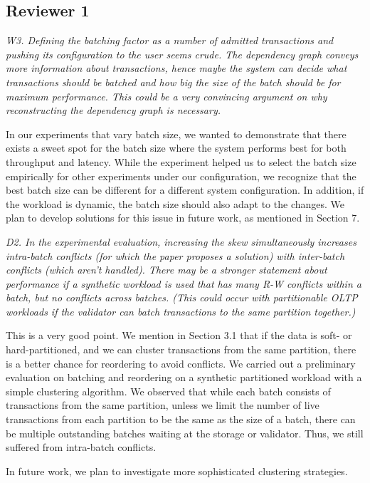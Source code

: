 \documentclass{article}
\begin{document}
\subsection{Reviewer 1}

\emph{W3. Defining the batching factor as a number of admitted transactions and pushing its configuration to the user seems crude. The dependency graph conveys more information about transactions, hence maybe the system can decide what transactions should be batched and how big the size of the batch should be for maximum performance. This could be a very convincing argument on why reconstructing the dependency graph is necessary.}

In our experiments that vary batch size, we wanted to demonstrate that there exists a sweet spot for the batch size where the system performs best for both throughput and latency. While the experiment helped us to select the batch size empirically for other experiments under our configuration, we recognize that the best batch size can be different for a different system configuration. In addition, if the workload is dynamic, the batch size should also adapt to the changes. We plan to develop solutions for this issue in future work, as mentioned in Section 7.

\emph{D2. In the experimental evaluation, increasing the skew simultaneously increases intra-batch conflicts (for which the paper proposes a solution) with inter-batch conflicts (which aren't handled). There may be a stronger statement about performance if a synthetic workload is used that has many R-W conflicts within a batch, but no conflicts across batches. (This could occur with partitionable OLTP workloads if the validator can batch transactions to the same partition together.)}

This is a very good point. We mention in Section 3.1 that if the data is soft- or hard-partitioned, and we can cluster transactions from the same partition, there is a better chance for reordering to avoid conflicts. We carried out a preliminary evaluation on batching and reordering on a synthetic partitioned workload with a simple clustering algorithm. We observed that while each batch consists of transactions from the same partition, unless we limit the number of live transactions from each partition to be the same as the size of a batch, there can be multiple outstanding batches waiting at the storage or validator. Thus, we still suffered from intra-batch conflicts. 

In future work, we plan to investigate more sophisticated clustering strategies.
\end{document}
